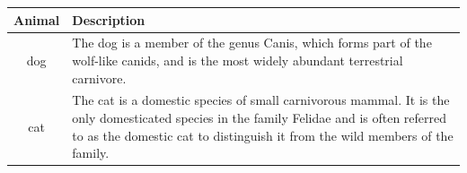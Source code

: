 \documentclass{article}
\begin{document}
	\begin{tabular}{cp{9cm}}
		\toprule
		Animal & Description \\
		\midrule
		dog & The dog is a member of the genus Canis, which forms part of the wolf-like canids, and is the most widely abundant terrestrial carnivore. \\
		\addlinespace
		cat & The cat is a domestic species of small carnivorous mammal. It is the only domesticated species in the family Felidae and is often referred to as the domestic cat to distinguish it from the wild members of the family. \\
		\bottomrule
	\end{tabular}
\end{document}
